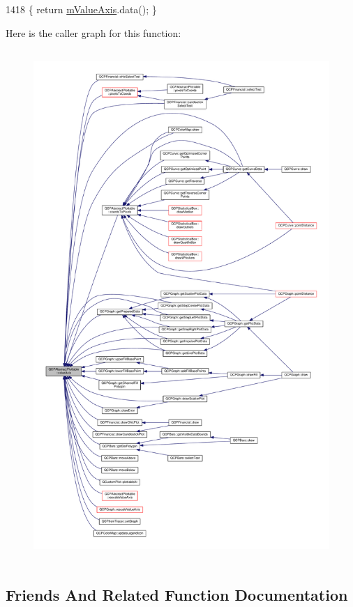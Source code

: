 \begin{DoxyCode}
1418 \{ \textcolor{keywordflow}{return} \hyperlink{class_q_c_p_abstract_plottable_a2901452ca4aea911a1827717934a4bda}{mValueAxis}.data(); \}
\end{DoxyCode}


Here is the caller graph for this function\+:\nopagebreak
\begin{figure}[H]
\begin{center}
\leavevmode
\includegraphics[height=550pt]{class_q_c_p_abstract_plottable_a3106f9d34d330a6097a8ec5905e5b519_icgraph}
\end{center}
\end{figure}




\subsection{Friends And Related Function Documentation}
\hypertarget{class_q_c_p_abstract_plottable_af123edeca169ec7a31958a1d714e1a8a}{}
